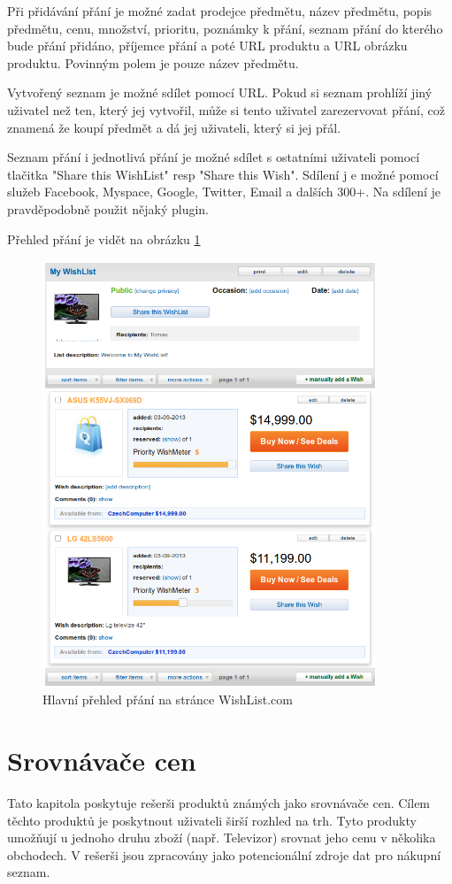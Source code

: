 Při přidávání přání je možné zadat prodejce předmětu, název předmětu, popis předmětu, cenu, množství, prioritu, poznámky k přání, seznam přání do kterého bude přání přidáno, příjemce přání a poté URL produktu a URL obrázku produktu. Povinným polem je pouze název předmětu.

Vytvořený seznam je možné sdílet pomocí URL. Pokud si seznam prohlíží jiný uživatel než ten, který jej vytvořil, může si tento uživatel zarezervovat přání, což znamená že koupí předmět a dá jej uživateli, který si jej přál.

Seznam přání i jednotlivá přání je možné sdílet s ostatními uživateli pomocí tlačitka "Share this WishList" resp "Share this Wish". Sdílení j e možné pomocí služeb Facebook, Myspace, Google, Twitter, Email a dalších 300+. Na sdílení je pravděpodobně použit nějaký plugin.

Přehled přání je vidět na obrázku \ref{fig:wishlist-wishlist}

\begin{figure}[htb]
\begin{center}
\includegraphics[width=100mm]{./pictures/wishlist-wishlist.png}
\caption{Hlavní přehled přání na stránce WishList.com}
\label{fig:wishlist-wishlist}
\end{center}
\end{figure}

\section{Srovnávače cen}
Tato kapitola poskytuje rešerši produktů známých jako srovnávače cen. Cílem těchto produktů je poskytnout uživateli širší rozhled na trh. Tyto produkty umožňují u jednoho druhu zboží (např. Televizor) srovnat jeho cenu v několika obchodech. V rešerši jsou zpracovány jako potencionální zdroje dat pro nákupní seznam.

